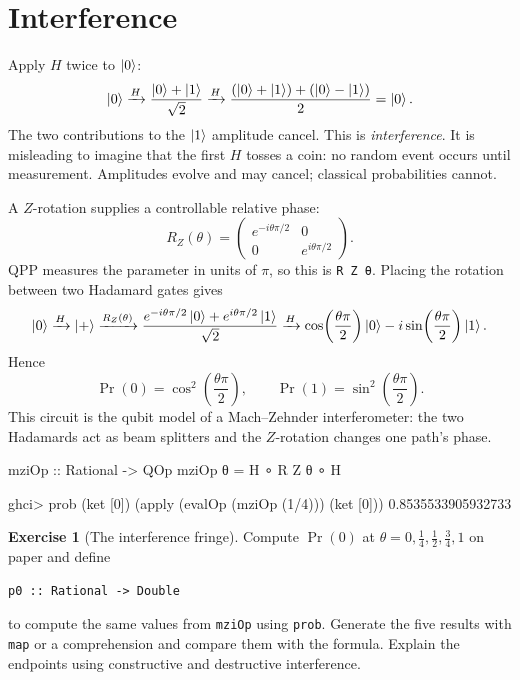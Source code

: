 \documentclass[11pt,a4paper]{article}
\theoremstyle{definition}
\newtheorem{exercise}{Exercise}[section]
\begin{document}
 
\section{Interference}
\label{sec:interference}

Apply $H$ twice to $\left| 0 \right\rangle$:
\[
  \left| 0 \right\rangle \xrightarrow{H} \frac{\left| 0 \right\rangle+\left| 1 \right\rangle}{\sqrt2}
  \xrightarrow{H}
  \frac{(\left| 0 \right\rangle+\left| 1 \right\rangle)+(\left| 0 \right\rangle-\left| 1 \right\rangle)}2=\left| 0 \right\rangle.
\]
The two contributions to the $\left| 1 \right\rangle$ amplitude cancel.  This is
\emph{interference}.  It is misleading to imagine that the first $H$ tosses
a coin: no random event occurs until measurement.  Amplitudes evolve and may
cancel; classical probabilities cannot.

A $Z$-rotation supplies a controllable relative phase:
\[
  R_Z(\theta)=
  \begin{pmatrix}
    e^{-i\theta\pi/2}&0\\0&e^{i\theta\pi/2}
  \end{pmatrix}.
\]
QPP measures the parameter in units of $\pi$, so this is \lstinline|R Z θ|.
Placing the rotation between two Hadamard gates gives
\[
  \left| 0 \right\rangle \xrightarrow{H} \left| + \right\rangle
  \xrightarrow{R_Z(\theta)}
  \frac{e^{-i\theta\pi/2}\left| 0 \right\rangle+e^{i\theta\pi/2}\left| 1 \right\rangle}{\sqrt2}
  \xrightarrow{H}
  \cos\!\left(\frac{\theta\pi}{2}\right)\left| 0 \right\rangle
  -i\sin\!\left(\frac{\theta\pi}{2}\right)\left| 1 \right\rangle.
\]
Hence
\[
  \Pr(0)=\cos^2\!\left(\frac{\theta\pi}{2}\right),\qquad
  \Pr(1)=\sin^2\!\left(\frac{\theta\pi}{2}\right).
\]
This circuit is the qubit model of a Mach--Zehnder interferometer: the two
Hadamards act as beam splitters and the $Z$-rotation changes one path's
phase.
\begin{qppcode}
mziOp :: Rational -> QOp
mziOp θ = H ∘ R Z θ ∘ H

ghci> prob (ket [0]) (apply (evalOp (mziOp (1/4))) (ket [0]))
0.8535533905932733
\end{qppcode}

\begin{exercise}[The interference fringe]
Compute $\Pr(0)$ at $\theta=0,\frac14,\frac12,\frac34,1$ on paper and
define
\begin{lstlisting}
p0 :: Rational -> Double
\end{lstlisting}
to compute the same values from \lstinline|mziOp| using \lstinline|prob|.
Generate the five results with \lstinline|map| or a comprehension and compare
them with the formula.  Explain the endpoints using constructive and
destructive interference.
\end{exercise}
\end{document}
